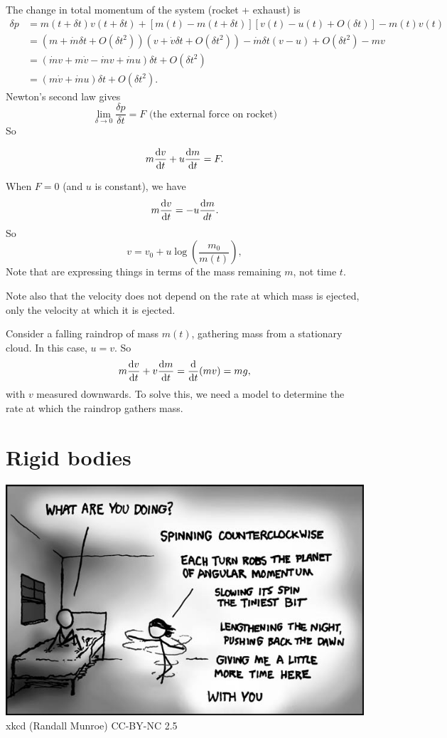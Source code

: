 \documentclass[a4paper]{article}
\begin{document}
The change in total momentum of the system (rocket + exhaust) is
\begin{align*}
  \delta p &= m(t + \delta t)v(t + \delta t) + [m(t) - m(t + \delta t)][v(t) - u(t) + O(\delta t)] - m(t)v(t)\\
  &= (m + \dot{m}\delta t + O(\delta t^2))(v + \dot{v} \delta t + O(\delta t^2)) - \dot{m}\delta t(v - u) + O(\delta t^2) - mv\\
  &= (\dot{m}v + m\dot{v} - \dot{m}v + \dot{m}u)\delta t + O(\delta t^2)\\
  &= (m\dot{v} + \dot{m}u)\delta t + O(\delta t^2).
\end{align*}
Newton's second law gives
\[
  \lim_{\delta \to 0} \frac{\delta p}{\delta t} = F\text{ (the external force on rocket)}
\]
So
\begin{prop}
  \[
    m\frac{\mathrm{d} v}{\mathrm{d} t} + u\frac{\mathrm{d} m}{\mathrm{d} t} = F.
  \]
\end{prop}
\begin{eg}
  When $F = 0$ (and $u$ is constant), we have
  \[
    m\frac{\mathrm{d} v}{\mathrm{d} t} = -u\frac{\mathrm{d} m}{d t}.
  \]
  So
  \[
    v = v_0 + u \log \left(\frac{m_0}{m(t)}\right),
  \]
  Note that are expressing things in terms of the mass remaining $m$, not time $t$.

  Note also that the velocity does not depend on the rate at which mass is ejected, only the velocity at which it is ejected.
\end{eg}

\begin{eg}
  Consider a falling raindrop of mass $m(t)$, gathering mass from a stationary cloud. In this case, $u = v$. So
  \[
    m\frac{\mathrm{d} v}{\mathrm{d} t} + v\frac{\mathrm{d} m}{\mathrm{d} t} = \frac{\mathrm{d} }{\mathrm{d} t}(mv) = mg,
  \]
  with $v$ measured downwards. To solve this, we need a model to determine the rate at which the raindrop gathers mass.
\end{eg}

\section{Rigid bodies}
\begin{center}
  \includegraphics[scale=0.5]{images/xkcd_angular_momentum.jpg}\\
  xkcd (Randall Munroe) CC-BY-NC 2.5
\end{center}
\end{document}
